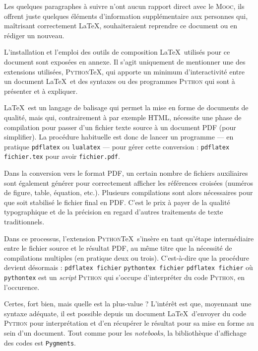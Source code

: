 Les quelques paragraphes à suivre n'ont aucun rapport direct avec le \textsc{Mooc}, ils offrent juste quelques éléments d'information supplémentaire aux personnes qui, maîtrisant correctement \LaTeX, souhaiteraient reprendre ce document ou en rédiger un nouveau.

L'installation et l'emploi des outils de composition \LaTeX\ utilisés pour ce document sont exposées en annexe. Il s'agit uniquement de mentionner une des extensions utilisées, \textsc{Python}\TeX, qui apporte un minimum d'interactivité entre un document \LaTeX\ et des syntaxes ou des programmes \textsc{Python} qui sont à présenter et à expliquer. %

\LaTeX\ est un langage de balisage qui permet la mise en forme de documents de qualité, mais qui, contrairement à par exemple HTML, nécessite une phase de compilation pour passer d'un fichier texte source à un document PDF (pour simplifier). La procédure habituelle est donc de lancer un programme --- en pratique \texttt{pdflatex} ou \texttt{lualatex} --- pour gérer cette conversion : \texttt{pdflatex fichier.tex} pour avoir \texttt{fichier.pdf}.

Dans la conversion vers le format PDF, un certain nombre de fichiers auxiliaires sont également générer pour correctement afficher les références croisées (numéros de figure, table, équation, etc.). Plusieurs compilations sont alors nécessaires pour que soit stabilisé le fichier final en PDF. C'est le prix à payer de la qualité typographique et de la précision en regard d'autres traitements de texte traditionnels.

Dans ce processus, l'extension \textsc{Python}\TeX\ s'insère en tant qu'étape intermédiaire entre le fichier source et le résultat PDF, au même titre que la nécessité de compilations multiples (en pratique deux ou trois). C'est-à-dire que la procédure devient désormais : \texttt{pdflatex fichier} \faCaretRight\space \texttt{pythontex fichier} \faCaretRight\space \texttt{pdflatex fichier} où \texttt{pythontex} est un \textit{script} \textsc{Python} qui s'occupe d'interpréter du code \textsc{Python}, en l'occurence.

Certes, fort bien, mais quelle est la plus-value ? L'intérêt est que, moyennant une syntaxe adéquate, il est possible depuis un document \LaTeX\ d'envoyer du code \textsc{Python} pour interprétation et d'en récupérer le résultat pour sa mise en forme au sein d'un document. Tout comme pour les \textit{notebooks}, la bibliothèque d'affichage des codes est \texttt{Pygments}.

